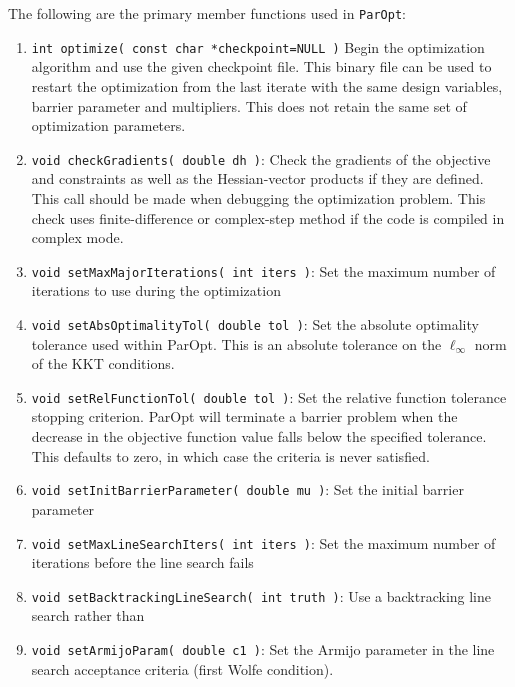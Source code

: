 \documentclass[12pt]{article}
\begin{document}
The following are the primary member functions used in \texttt{ParOpt}:
\begin{enumerate}
\item \texttt{int optimize( const char *checkpoint=NULL )} Begin the optimization algorithm and use the given checkpoint file. This binary file can be used to restart the optimization from the last iterate with the same design variables, barrier parameter and multipliers. This does not retain the same set of optimization parameters.

\item \texttt{void checkGradients( double dh )}: Check the gradients of the objective and constraints as well as the Hessian-vector products if they are defined. This call should be made when debugging the optimization problem. This check uses finite-difference or complex-step method if the code is compiled in complex mode.

\item \texttt{void setMaxMajorIterations( int iters )}: Set the maximum number of iterations to use during the optimization

\item \texttt{void setAbsOptimalityTol( double tol )}: Set the absolute optimality tolerance used within ParOpt. This is an absolute tolerance on the $\ell_{\infty}$ norm of the KKT conditions.

\item \texttt{void setRelFunctionTol( double tol )}: Set the relative function tolerance stopping criterion. ParOpt will terminate a barrier problem when the decrease in the objective function value falls below the specified tolerance. This defaults to zero, in which case the criteria is never satisfied.

\item \texttt{void setInitBarrierParameter( double mu )}: Set the initial barrier parameter

\item \texttt{void setMaxLineSearchIters( int iters )}: Set the maximum number of iterations before the line search fails

\item \texttt{void setBacktrackingLineSearch( int truth )}: Use a backtracking line search rather than 

\item \texttt{void setArmijoParam( double c1 )}: Set the Armijo parameter in the line search acceptance criteria (first Wolfe condition).


\end{enumerate}
\end{document}
